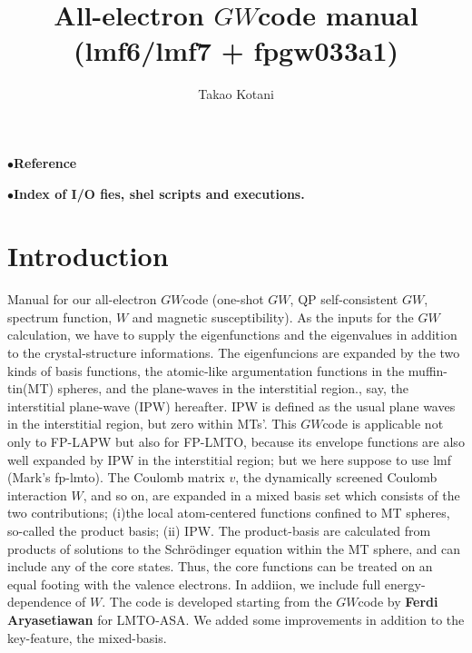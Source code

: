 \documentclass[a4paper,10pt,epsf,fleqn]{article}
\newcommand{\GW}{$GW$}
\begin{document}
\baselineskip=6mm
\title{All-electron \GW code manual (lmf6/lmf7 + fpgw033a1)}
\author{Takao Kotani}
\maketitle
\tableofcontents

\vspace{5mm}
\noindent$\bullet${\bf Reference}

\vspace{5mm}
\noindent$\bullet${\bf Index of I/O fies, shel scripts and executions.}

\newpage
\section{Introduction}
Manual for our all-electron \GW code (one-shot \GW, QP self-consistent \GW, spectrum function, 
$W$ and magnetic susceptibility).
As the inputs for the \GW calculation,
we have to supply the eigenfunctions and the eigenvalues
in addition to the crystal-structure informations.
The eigenfuncions are expanded by the two kinds of basis functions,
the atomic-like argumentation functions in the muffin-tin(MT) spheres,
and the plane-waves in the interstitial region., say, the interstitial plane-wave (IPW) hereafter.
IPW is defined as the usual plane waves in the interstitial region, 
but zero within MTs'.
This \GW code is applicable not only to FP-LAPW but also for FP-LMTO,
because its envelope functions are also well expanded
by IPW in the interstitial region; but we here suppose to use lmf (Mark's fp-lmto).
The Coulomb matrix $v$, the dynamically screened 
Coulomb interaction $W$, and so on, are expanded 
in a mixed basis set which consists of the two contributions;
(i)the local atom-centered functions confined to MT spheres, so-called
the product basis; (ii) IPW.
The product-basis are calculated from products of
solutions to the Schr\"odinger equation within the
MT sphere, and can include any of the core states.
Thus, the core functions can be treated on an equal footing
with the valence electrons.
In addiion, we include full energy-dependence of $W$.
The code is developed starting from the \GW code 
by {\bf Ferdi Aryasetiawan} for LMTO-ASA.
We added some improvements in addition to the key-feature, the mixed-basis.\\


%
\end{document}
